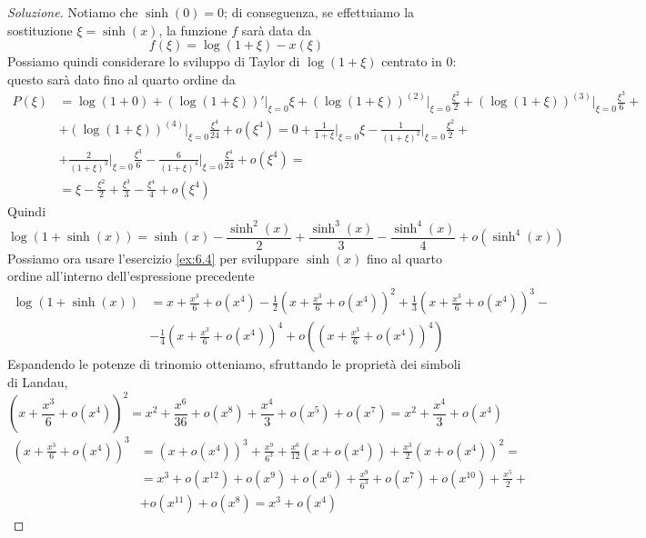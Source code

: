 \begin{proof}[Soluzione]
    Notiamo che $\sinh(0) = 0$; di conseguenza, se effettuiamo la sostituzione $\xi = \sinh(x)$, la funzione $f$ sarà data da
    \[
    f(\xi) = \log(1+\xi)-x(\xi)
    \]
    Possiamo quindi considerare lo sviluppo di Taylor di $\log(1+\xi)$ centrato in $0$: questo sarà dato fino al quarto ordine da
    \[
    \begin{split}
        P(\xi) & = \log(1+0) + (\log(1+\xi))'\Big|_{\xi=0} \xi + (\log(1+\xi))^{(2)}\Big|_{\xi=0}\frac{\xi^2}{2} + (\log(1+\xi))^{(3)}\Big|_{\xi=0}\frac{\xi^3}{6} + \\
        & + (\log(1+\xi))^{(4)}\Big|_{\xi=0}\frac{\xi^4}{24} + o(\xi^4) = 0 + \frac{1}{1+\xi}\bigg|_{\xi=0} \xi - \frac{1}{(1+\xi)^2}\bigg|_{\xi=0}\frac{\xi^2}{2} + \\
        & + \frac{2}{(1+\xi)^3}\bigg|_{\xi=0}\frac{\xi^3}{6}-\frac{6}{(1+\xi)^4}\bigg|_{\xi=0}\frac{\xi^4}{24} +o(\xi^4) = \\
        & = \xi -\frac{\xi^2}{2} + \frac{\xi^3}{3}-\frac{\xi^4}{4}+o(\xi^4)
    \end{split}
    \]
    Quindi
    \[
    \log(1+\sinh(x))= \sinh(x)-\frac{\sinh^2(x)}{2}+\frac{\sinh^3(x)}{3}-\frac{\sinh^4(x)}{4}+o(\sinh^4(x))
    \]
    Possiamo ora usare l'esercizio \ref{ex:6.4} per sviluppare $\sinh(x)$ fino al quarto ordine all'interno dell'espressione precedente
    \[
    \begin{split}
        \log(1+\sinh(x)) & = x + \frac{x^3}{6}+o(x^4)-\frac{1}{2}\left(x+\frac{x^3}{6}+o(x^4)\right)^2 + \frac{1}{3}\left(x+\frac{x^3}{6}+o(x^4)\right)^3-\\
        & -\frac{1}{4}\left(x+\frac{x^3}{6}+o(x^4)\right)^4 + o\left(\left(x+\frac{x^3}{6}+o(x^4)\right)^4\right)
    \end{split}
    \]
    Espandendo le potenze di trinomio otteniamo, sfruttando le proprietà dei simboli di Landau,
    \[
    \left(x+\frac{x^3}{6}+o(x^4)\right)^2 = x^2 + \frac{x^6}{36}+o(x^8) + \frac{x^4}{3} + o(x^5) + o(x^7) = x^2 + \frac{x^4}{3} + o(x^4)
    \]
    \[
    \begin{split}
        \left(x+\frac{x^3}{6}+o(x^4)\right)^3 & = (x+o(x^4))^3 + \frac{x^9}{6^3} + \frac{x^6}{12}(x+o(x^4))+\frac{x^3}{2}(x+o(x^4))^2 = \\
        & = x^3 + o(x^{12}) + o(x^9)+o(x^6) + \frac{x^9}{6^3} +o(x^7) +o(x^{10}) + \frac{x^5}{2} + \\
        & + o(x^{11}) + o(x^8) = x^3 + o(x^4)
    \end{split}
    \]

\end{proof}
